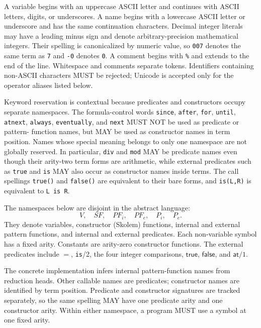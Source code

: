 \documentclass[11pt]{article}
\newcommand{\true}{\mathsf{true}}
\newcommand{\false}{\mathsf{false}}
\newcommand{\at}{\mathsf{at}}
\begin{document}
A variable begins with an uppercase ASCII letter and continues with ASCII
letters, digits, or underscores.  A name begins with a lowercase ASCII letter
or underscore and has the same continuation characters.  Decimal integer
literals may have a leading minus sign and denote arbitrary-precision
mathematical integers.  Their spelling is canonicalized by numeric value, so
\verb|007| denotes the same term as \verb|7| and \verb|-0| denotes
\verb|0|.  A comment begins with \verb|%| and extends to the end of the line.
Whitespace and comments separate tokens.  Identifiers containing non-ASCII
characters MUST be rejected; Unicode is accepted only for the operator aliases
listed below.

Keyword reservation is contextual because predicates and constructors occupy
separate namespaces.  The formula-control words \verb|since|, \verb|after|,
\verb|for|, \verb|until|, \verb|atnext|, \verb|always|,
\verb|eventually|, and \verb|next| MUST NOT be used as predicate or pattern-
function names, but MAY be used as constructor names in term position.  Names
whose special meaning belongs to only one namespace are not globally reserved.
In particular, \verb|div| and \verb|mod| MAY be predicate names even though
their arity-two term forms are arithmetic, while external predicates such as
\verb|true| and \verb|is| MAY also occur as constructor names inside terms.
The call spellings \verb|true()| and \verb|false()| are equivalent to their
bare forms, and \verb|is(L,R)| is equivalent to \verb|L is R|.

The namespaces below are disjoint in the abstract language:
\[
V,\quad SF,\quad PF_i,\quad PF_e,\quad P_i,\quad P_e.
\]
They denote variables, constructor (Skolem) functions, internal and external
pattern functions, and internal and external predicates.  Each non-variable
symbol has a fixed arity.  Constants are arity-zero constructor functions.
The external predicates include $=$, \verb|is|/2, the four integer
comparisons, $\true$, $\false$, and $\at/1$.

The concrete implementation infers internal pattern-function names from
reduction heads.  Other callable names are predicates; constructor names are
identified by term position.  Predicate and constructor signatures are tracked
separately, so the same spelling MAY have one predicate arity and one
constructor arity.  Within either namespace, a program MUST use a symbol at one
fixed arity.
\end{document}
